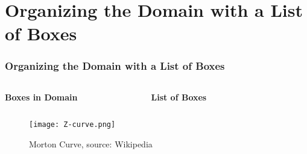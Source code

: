 \section{Organizing the Domain with a List of Boxes}
\begin{frame}
    \frametitle{Organizing the Domain with a List of Boxes}

    \begin{columns}[c]
    \textbf{Boxes in Domain}
    \begin{figure}[h]
        \centering
        \resizebox{.9\textwidth}{!}{%
            
        }
    \end{figure}

    \textbf{List of Boxes}
    \begin{figure}[h]
        \centering
        \resizebox{.9\textwidth}{!}{%
            
        }
    \end{figure}
    \end{columns}

\end{frame}


\begin{frame}
    \begin{figure}
        \centering
        \texttt{[image: Z-curve.png]}
        \caption{Morton Curve, source: Wikipedia}
    \end{figure}
\end{frame}



